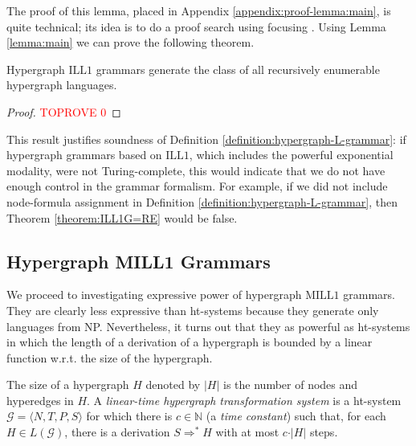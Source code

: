 \documentclass[a4paper,UKenglish,cleveref, autoref, thm-restate,pdfa]{lipics-v2021}
\newcommand{\Nat}{\mathbb{N}}
\newcommand{\Gram}{\mathcal{G}}
\newcommand{\ILLFO}{\mathrm{ILL}1}
\newcommand{\MILLFO}{\mathrm{MILL}1}
\begin{document}
The proof of this lemma, placed in Appendix \ref{appendix:proof-lemma:main}, is quite technical; its idea is to do a proof search using focusing \cite{Andreoli92}. Using Lemma \ref{lemma:main} we can prove the following theorem.

\begin{theorem}\label{theorem:ILL1G=RE}
	Hypergraph $\ILLFO$ grammars generate the class of all recursively enumerable hypergraph languages.
\end{theorem}
\begin{proof}\textcolor{red}{TOPROVE 0}\end{proof}

This result justifies soundness of Definition \ref{definition:hypergraph-L-grammar}: if hypergraph grammars based on $\ILLFO$, which includes the powerful exponential modality, were not Turing-complete, this would indicate that we do not have enough control in the grammar formalism. For example, if we did not include node-formula assignment in Definition \ref{definition:hypergraph-L-grammar}, then Theorem \ref{theorem:ILL1G=RE} would be false.

\subsection{Hypergraph MILL1 Grammars}\label{subsection:hypergraph-MILL1-grammars}

We proceed to investigating expressive power of hypergraph $\MILLFO$ grammars. They are clearly less expressive than ht-systems because they generate only languages from NP. Nevertheless, it turns out that they as powerful as ht-systems in which the length of a derivation of a hypergraph is bounded by a linear function w.r.t. the size of the hypergraph.
\begin{definition}
	The size of a hypergraph $H$ denoted by $\vert H \vert$ is the number of nodes and hyperedges in $H$. A \emph{linear-time hypergraph transformation system} is a ht-system $\Gram = \langle N, T, P, S\rangle$ for which there is $c \in \Nat$ (a \emph{time constant}) such that, for each $H \in L(\Gram)$, there is a derivation $S \Rightarrow^\ast H$ with at most $c \cdot \vert H\vert$ steps.
\end{definition}
\end{document}
